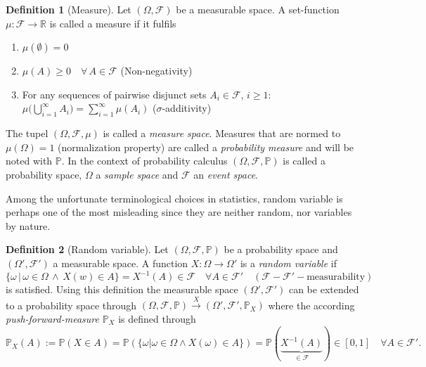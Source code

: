 \documentclass[
]{report}
\theoremstyle{definition}
\newtheorem{definition}{Definition}[section]
\begin{document}
\begin{definition}[Measure]
Let $(\Omega, \mathcal{F})$ be a measurable space. A set-function $\mu : \mathcal{F} \rightarrow \mathbb{R}$ is called a {measure} if it fulfils
\begin{enumerate}
  \item $\mu(\emptyset) = 0$ 
  \item $\mu(A) \geq 0 \quad \forall \, A \in \mathcal{F}$ \quad (Non-negativity)
  \item For any sequences of pairwise disjunct sets $A_i \in \mathcal{F}, \, i \geq 1$: \newline
    $\mu \big(\bigcup_{i=1}^{\infty} A_i \big) = \sum_{i=1}^{\infty} \mu(A_i)$ \quad ($\sigma$-additivity)
\end{enumerate}
The tupel $(\Omega, \mathcal{F}, \mu)$ is called a \textit{measure space}. Measures that are normed to $\mu(\Omega) = 1$ (normalization property) are called a \textit{probability measure} and will be noted with $\mathbb{P}$. In the context of probability calculus $(\Omega, \mathcal{F}, \mathbb{P})$ is called a probability space, $\Omega$ a \textit{sample space} and $\mathcal{F}$ an \textit{event space}.
\end{definition}

Among the unfortunate terminological choices in statistics, random
variable is perhaps one of the most misleading since they are neither
random, nor variables by nature.

\begin{definition}[Random variable]
Let $(\Omega, \mathcal{F}, \mathbb{P})$ be a probability space and $(\Omega', \mathcal{F}')$ a measurable space. A function $X: \Omega \rightarrow \Omega'$ is a \textit{random variable} if 
$$ \{\omega \, | \,  \omega \in \Omega \, \land \, X(w) \in A \} = X^{-1} (A) \in \mathcal{F} \quad \forall A \in \mathcal{F}' \quad (\mathcal{F}-\mathcal{F}'-\text{measurability})$$
is satisfied. Using this definition the measurable space $(\Omega', \mathcal{F}')$ can be extended to a probability space through \mbox{$(\Omega, \mathcal{F}, \mathbb{P}) \xrightarrow{X} (\Omega', \mathcal{F}', \mathbb{P}_X)$} where the according \textit{push-forward-measure} $\mathbb{P}_X$ is defined through 
$$\mathbb{P}_X (A) := \mathbb{P}(X \in A) \overset{}{=} \mathbb{P} (\{\omega | \omega \in \Omega \land X(\omega) \in A \}) \overset{\text{}}{=} \mathbb{P}( \underbrace{X^{-1} (A)}_{\in \mathcal{F}}) \in [0,1] \quad \forall A \in \mathcal{F}'.$$
\end{definition}
\end{document}
